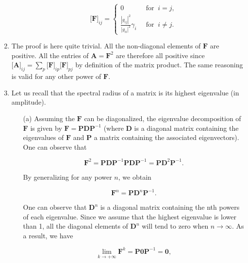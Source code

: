 \documentclass [a4paper, 11pt] {article}
\begin{document}
\begin{solution}
\begin{enumerate}
\begin{itemize}
        \begin{equation}
            \big[\mathbf{F}\big]_{ij} = \begin{cases}
             0 & \; \; \text{for} \; \; i=j, \\
             \frac{|g_{ij}|^2}{|g_{ii}|^2} \gamma_i & \; \; \text{for} \; \; i \neq j.
            \end{cases}
        \end{equation}
    \end{itemize}

    \item The proof is here quite trivial. All the non-diagonal elements of $\mathbf{F}$ are positive. All the entries of $\mathbf{A} = \mathbf{F}^2$ are therefore all positive since $\big[\mathbf{A}\big]_{ij} = \sum_p \big[\mathbf{F}\big]_{ip} \big[\mathbf{F}\big]_{pj}$ by definition of the matrix product. The same reasoning is valid for any other power of $\mathbf{F}$.
    \item Let us recall that the spectral radius of a matrix is its highest eigenvalue (in amplitude).

    \begin{itemize}
        \item[(a)] Assuming the $\mathbf{F}$ can be diagonalized, the eigenvalue decomposition of $\mathbf{F}$ is given by $\mathbf{F} = \mathbf{P} \mathbf{D} \mathbf{P}^{-1}$ (where $\mathbf{D}$ is a diagonal matrix containing the eigenvalues of $\mathbf{F}$ and $\mathbf{P}$ a matrix containing the associated eigenvectors). One can observe that

        \begin{equation} \mathbf{F}^2 = \mathbf{P}\mathbf{D}\mathbf{P}^{-1}\mathbf{P}\mathbf{D}\mathbf{P}^{-1} = \mathbf{P}\mathbf{D}^2\mathbf{P}^{-1}.
        \end{equation}

        By generalizing for any power $n$, we obtain

        \begin{equation} \mathbf{F}^n = \mathbf{P}\mathbf{D}^n\mathbf{P}^{-1}. \end{equation}

        One can observe that $\mathbf{D}^n$ is a diagonal matrix containing the nth powers of each eigenvalue. Since we assume that the highest eigenvalue is lower than 1, all the diagonal elements of $\mathbf{D}^n$ will tend to zero when $n \rightarrow \infty$. As a result, we have

        \begin{equation}\lim_{k\rightarrow + \infty} \mathbf{F}^k = \mathbf{P}\mathbf{0}\mathbf{P}^{-1} = \mathbf{0},
        \end{equation}


\end{itemize}
\end{enumerate}
\end{solution}
\end{document}
